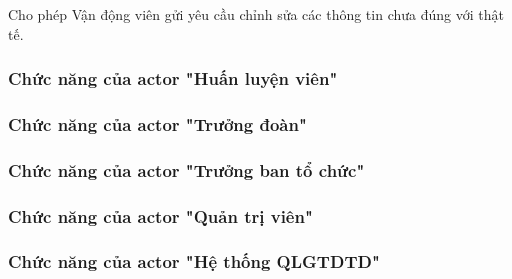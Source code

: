 Cho phép Vận động viên gửi yêu cầu chỉnh sửa các thông tin chưa đúng với thật tế.

\subsubsection{Chức năng của actor "Huấn luyện viên"}

\subsubsection{Chức năng của actor "Trưởng đoàn"}

\subsubsection{Chức năng của actor "Trưởng ban tổ chức"}

\subsubsection{Chức năng của actor "Quản trị viên"}

\subsubsection{Chức năng của actor "Hệ thống QLGTDTD"}
